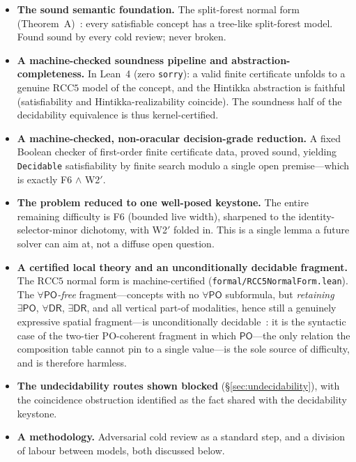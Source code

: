 \documentclass[
]{ceurart}
\theoremstyle{definition}
\newcommand{\DR}{\ensuremath{\mathsf{DR}}}
\newcommand{\PO}{\ensuremath{\mathsf{PO}}}
\begin{document}
\begin{itemize}
  \item \textbf{The sound semantic foundation.}  The split-forest normal
    form (Theorem~A)~\cite{SiblingCompleted,SiblingInterfaceV2}: every
    satisfiable concept has a tree-like split-forest model.  Found sound
    by every cold review; never broken.
  \item \textbf{A machine-checked soundness pipeline and
    abstraction-completeness.}  In Lean~4 (zero \texttt{sorry}): a valid
    finite certificate unfolds to a genuine $\mathrm{RCC5}$ model of the
    concept, and the Hintikka abstraction is faithful (satisfiability and
    Hintikka-realizability coincide).  The soundness half of the
    decidability equivalence is thus kernel-certified.
  \item \textbf{A machine-checked, non-oracular decision-grade
    reduction.}  A fixed Boolean checker of first-order finite
    certificate data, proved sound, yielding \texttt{Decidable}
    satisfiability by finite search modulo a single open premise---which
    is exactly F6 $\wedge$ W2$'$.
  \item \textbf{The problem reduced to one well-posed keystone.}  The
    entire remaining difficulty is F6 (bounded live width), sharpened to
    the identity-selector-minor dichotomy, with W2$'$ folded in.  This is
    a single lemma a future solver can aim at, not a diffuse open
    question.
  \item \textbf{A certified local theory and an unconditionally decidable
    fragment.}  The $\mathrm{RCC5}$ normal form is machine-certified
    (\texttt{formal/RCC5NormalForm.lean}).  The
    \emph{$\forall\PO$-free} fragment---concepts with no $\forall\PO$
    subformula, but \emph{retaining} $\exists\PO$, $\forall\DR$,
    $\exists\DR$, and all vertical part-of modalities, hence still a
    genuinely expressive spatial fragment---is unconditionally
    decidable~\cite{TwoTierQuotient}: it is the syntactic case of the
    two-tier PO-coherent fragment in which $\PO$---the only relation the
    composition table cannot pin to a single value---is the sole source
    of difficulty, and is therefore harmless.
  \item \textbf{The undecidability routes shown blocked}
    (\S\ref{sec:undecidability}), with the coincidence obstruction identified
    as the fact shared with the decidability keystone.
  \item \textbf{A methodology.}  Adversarial cold review as a standard
    step, and a division of labour between models, both discussed below.
\end{itemize}
\end{document}
